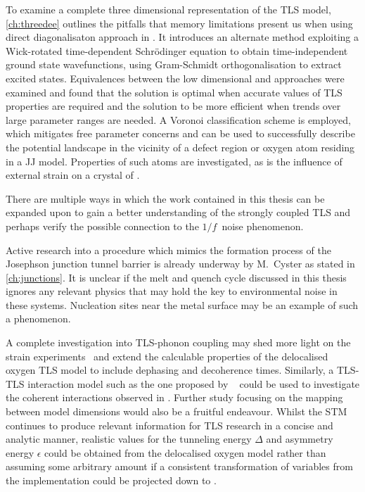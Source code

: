 To examine a complete three dimensional representation of the TLS model, \cref{ch:threedee} outlines the pitfalls that memory limitations present us when using direct diagonalisaton approach in .
It introduces an alternate method exploiting a Wick-rotated time-dependent Schrödinger equation to obtain time-independent ground state wavefunctions, using Gram-Schmidt orthogonalisation to extract excited states.
Equivalences between the low dimensional and  approaches were examined and found that the  solution is optimal when accurate values of TLS properties are required and the  solution to be more efficient when trends over large parameter ranges are needed.
A Voronoi classification scheme is employed, which mitigates free parameter concerns and can be used to successfully describe the potential landscape in the vicinity of a defect region or oxygen atom residing in a JJ model.
Properties of such atoms are investigated, as is the influence of external strain on a crystal of .

\divtext

There are multiple ways in which the work contained in this thesis can be expanded upon to gain a better understanding of the strongly coupled TLS and perhaps verify the possible connection to the $1/f\,$ noise phenomenon.

Active research into a procedure which mimics the formation process of the Josephson junction tunnel barrier is already underway by M.~Cyster as stated in \cref{ch:junctions}.
It is unclear if the melt and quench cycle discussed in this thesis ignores any relevant physics that may hold the key to environmental noise in these systems.
Nucleation sites near the metal surface may be an example of such a phenomenon.

A complete investigation into TLS-phonon coupling may shed more light on the strain experiments~\cite{Grabovskij2012} and extend the calculable properties of the delocalised oxygen TLS model to include dephasing and decoherence times.
Similarly, a TLS-TLS interaction model such as the one proposed by \citeauthor{Faoro2015}~\cite{Faoro2015} could be used to investigate the coherent interactions observed in .
Further study focusing on the mapping between model dimensions would also be a fruitful endeavour.
Whilst the STM continues to produce relevant information for TLS research in a concise and analytic manner, realistic values for the tunneling energy $\Delta$ and asymmetry energy $\epsilon$ could be obtained from the delocalised oxygen model rather than assuming some arbitrary amount if a consistent transformation of variables from the  implementation could be projected down to .

